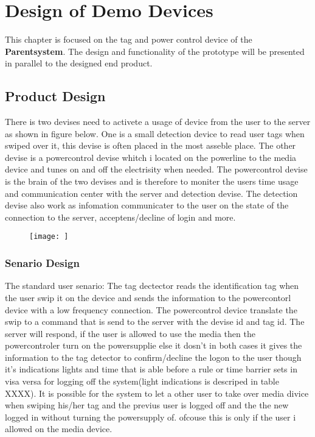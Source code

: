 \chapter{Design of Demo Devices}
This chapter is focused on the tag and power control device of the \textbf{Parentsystem}. 
The design and functionality of the prototype will be presented in parallel to the designed end product.
\section{Product Design}
There is two devises need to activete a usage of device from the user to the server as shown in figure below.
One is a small detection device to read user tags when swiped over it, this devise is often placed in the most asseble place. 
The other devise is a powercontrol devise whitch i located on the powerline to the media device and tunes on and off the electrisity when needed.
The powercontrol devise is the brain of the two devises and is therefore to moniter the users time usage and communication center with the server and detection devise. 
The detection devise also work as infomation communicater to the user on the state of the connection to the server, acceptens/decline of login and more.     

\begin{figure}
	\centering
		\texttt{[image: ]}
\end{figure}

\subsection{Senario Design}

The standard user senario:
The tag dectector reads the identification tag when the user swip it on the device and sends the information to the powercontorl device with a low frequency connection.
The powercontrol device translate the swip to a command that is send to the server with the devise id and tag id. The server will respond, if the user is allowed to use the media then the powercontroler turn on the powersupplie else it dosn't in both cases it gives the information to the tag detector to confirm/decline the logon to the user though it's indications lights and time that is able before a rule or time barrier sets in visa versa for logging off the system(light indications is descriped in table XXXX). It is possible for the system to let a other user to take over media divice when swiping his/her tag and the previus user is logged off and the the new logged in without turning the powersupply of. ofcouse this is only if the user i allowed on the media device. 

